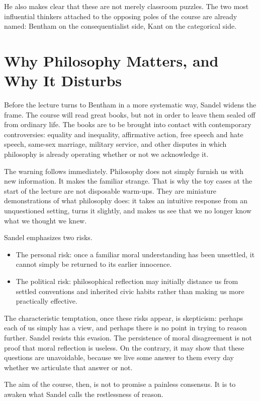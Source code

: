 He also makes clear that these are not merely classroom puzzles. The two most influential thinkers attached to the opposing poles of the course are already named: Bentham on the consequentialist side, Kant on the categorical side.

\section{Why Philosophy Matters, and Why It Disturbs}

Before the lecture turns to Bentham in a more systematic way, Sandel widens the frame. The course will read great books, but not in order to leave them sealed off from ordinary life. The books are to be brought into contact with contemporary controversies: equality and inequality, affirmative action, free speech and hate speech, same-sex marriage, military service, and other disputes in which philosophy is already operating whether or not we acknowledge it.

The warning follows immediately. Philosophy does not simply furnish us with new information. It makes the familiar strange. That is why the toy cases at the start of the lecture are not disposable warm-ups. They are miniature demonstrations of what philosophy does: it takes an intuitive response from an unquestioned setting, turns it slightly, and makes us see that we no longer know what we thought we knew.

Sandel emphasizes two risks.

\begin{itemize}
\item The personal risk: once a familiar moral understanding has been unsettled, it cannot simply be returned to its earlier innocence.
\item The political risk: philosophical reflection may initially distance us from settled conventions and inherited civic habits rather than making us more practically effective.
\end{itemize}

The characteristic temptation, once these risks appear, is skepticism: perhaps each of us simply has a view, and perhaps there is no point in trying to reason further. Sandel resists this evasion. The persistence of moral disagreement is not proof that moral reflection is useless. On the contrary, it may show that these questions are unavoidable, because we live some answer to them every day whether we articulate that answer or not.

The aim of the course, then, is not to promise a painless consensus. It is to awaken what Sandel calls the restlessness of reason.

